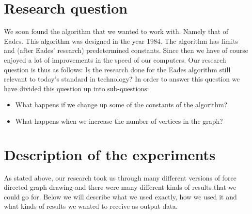 \documentclass[a4paper,12pt,twoside]{article}
\begin{document}
\section{Research question}\label{s:question}
We soon found the algorithm that we wanted to work with. Namely that of Eades. This algorithm was designed in the year 1984. The algorithm has limits and (after Eades' research) predetermined constants. Since then we have of course enjoyed a lot of improvements in the speed of our computers. Our research question is thus as follows: Is the research done for the Eades algorithm still relevant to today's standard in technology? In order to answer this question we have divided this question up into sub-questions:
\begin{itemize}
\item What happens if we change up some of the constants of the algorithm?
\item What happens when we increase the number of vertices in the graph?
\end{itemize}

\section{Description of the experiments}
As stated above, our research took us through many different versions of force directed graph drawing and there were many different kinds of results that we could go for. Below we will describe what we used exactly, how we used it and what kinds of results we wanted to receive as output data.
\end{document}
